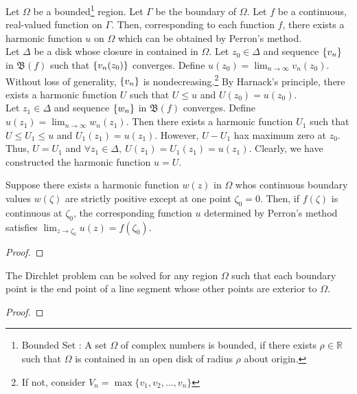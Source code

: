 \begin{remark}
	Let $\Omega$ be a bounded\footnote{Bounded Set : A set $\Omega$ of complex numbers is bounded, if there exists $\rho \in \mathbb{R}$ such that $\Omega$ is contained in an open disk of radius $\rho$ about origin.} region.
	Let $\Gamma$ be the boundary of $\Omega$.
	Let $f$ be a continuous, real-valued function on $\Gamma$.
	Then, corresponding to each function $f$, there exists a harmonic function $u$ on $\Omega$ which can be obtained by Perron's method.\\

	Let $\Delta$ be a disk whose closure in contained in $\Omega$.
	Let $z_0 \in \Delta$ and sequence $\left\{v_n\right\}$ in $\mathfrak{B}(f)$ such that $\left\{v_n(z_0)\right\}$ converges.
	Define $u(z_0) = \lim_{n \to \infty} v_n(z_0)$.
	Without loss of generality, $\left\{v_n\right\}$ is nondecreasing.\footnote{If not, consider $V_n = \max\{v_1,v_2,\dots,v_n\}$}
	By Harnack's principle, there exists a harmonic function $U$ such that $U \le u$ and $U(z_0) = u(z_0)$.\\

	Let $z_1 \in \Delta$ and sequence $\left\{w_n\right\}$ in $\mathfrak{B}(f)$ converges.
	Define $u(z_1) = \lim_{n \to \infty} w_n(z_1)$.
	Then there exists a harmonic function $U_1$ such that $U \le U_1 \le u$ and $U_1(z_1) = u(z_1)$.
	However, $U - U_1$ hax maximum zero at $z_0$.
	Thus, $U = U_1$ and $\forall z_1 \in \Delta,\ U(z_1) = U_1(z_1) = u(z_1)$.
	Clearly, we have constructed the harmonic function $u = U$.
\end{remark}

\begin{lemma}
	Suppose there exists a harmonic function $w(z)$ in $\Omega$ whos continuous boundary values $w(\zeta)$ are strictly positive except at one point $\zeta_0 = 0$. Then, if $f(\zeta)$ is continuous at $\zeta_0$, the corresponding function $u$ determined by Perron's method satisfies $\displaystyle \lim_{z \to \zeta_0} u(z) = f(\zeta_0)$.
\end{lemma}
\begin{proof}
\end{proof}

\begin{theorem}
	The Dirchlet problem can be solved for any region $\Omega$ such that each boundary point is the end point of a line segment whose other points are exterior to $\Omega$.
\end{theorem}
\begin{proof}
\end{proof}

